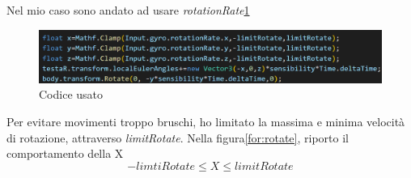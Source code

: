 \documentclass[
a4paper,
cleardoublepage=empty,
headings=twolinechapter,
numbers=autoenddot,
]{scrbook}
\begin{document}
     Nel mio caso sono andato ad usare \textit{rotationRate}\ref{fig:code_giro}
      \begin{figure}[H]
     	\centering
     	\includegraphics[width=1\linewidth]{image/codice_giro}
     	\caption{Codice usato}
     	\label{fig:code_giro}
     \end{figure}
     Per evitare movimenti troppo bruschi, ho limitato la massima e minima velocità di rotazione, attraverso \textit{limitRotate}.
     Nella figura\ref{for:rotate}, riporto il comportamento della X
     \begin{displaymath}\label{for:rotate}
     	-limtiRotate  \leq X \leq limitRotate
     \end{displaymath}
\end{document}

